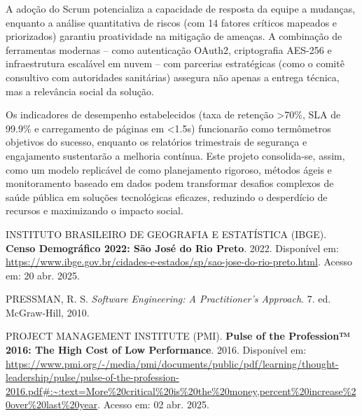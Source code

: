 \documentclass[a5paper, 12pt]{article}
\begin{document}
A adoção do Scrum potencializa a capacidade de resposta da equipe a mudanças, enquanto a análise quantitativa de riscos (com 14 fatores críticos mapeados e priorizados) garantiu proatividade na mitigação de ameaças. A combinação de ferramentas modernas – como autenticação OAuth2, criptografia AES-256 e infraestrutura escalável em nuvem – com parcerias estratégicas (como o comitê consultivo com autoridades sanitárias) assegura não apenas a entrega técnica, mas a relevância social da solução.

Os indicadores de desempenho estabelecidos (taxa de retenção >70\%, SLA de 99.9\% e carregamento de páginas em <1.5s) funcionarão como termômetros objetivos do sucesso, enquanto os relatórios trimestrais de segurança e engajamento sustentarão a melhoria contínua. Este projeto consolida-se, assim, como um modelo replicável de como planejamento rigoroso, métodos ágeis e monitoramento baseado em dados podem transformar desafios complexos de saúde pública em soluções tecnológicas eficazes, reduzindo o desperdício de recursos e maximizando o impacto social.


\newpage
\renewcommand{\refname}{Bibliografia}
\begin{thebibliography}{09}
 INSTITUTO BRASILEIRO DE GEOGRAFIA E ESTATÍSTICA (IBGE). 
\textbf{Censo Demográfico 2022: São José do Rio Preto}. 
2022. 
Disponível em: \url{https://www.ibge.gov.br/cidades-e-estados/sp/sao-jose-do-rio-preto.html}. 
Acesso em: 20 abr. 2025.

 PRESSMAN, R. S. \textit{Software Engineering: A Practitioner’s Approach}. 7. ed. McGraw‑Hill, 2010.

 PROJECT MANAGEMENT INSTITUTE (PMI). \textbf{Pulse of the Profession™ 2016: The High Cost of Low Performance}. 2016. Disponível em: \url{https://www.pmi.org/-/media/pmi/documents/public/pdf/learning/thought-leadership/pulse/pulse-of-the-profession-2016.pdf#:~:text=More%20critical%20is%20the%20money,percent%20increase%20over%20last%20year}. Acesso em: 02 abr. 2025.

\end{thebibliography}
\end{document}
